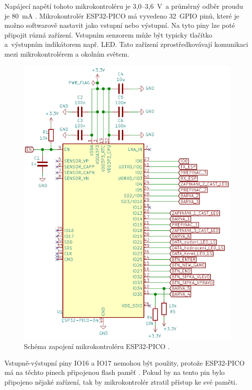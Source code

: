   Napájecí napětí tohoto mikrokontroléru je 3,0--3,6~V~a průměrný odběr proudu je 80~mA \cite{PICO_datasheet}. Mikrokontrolér ESP32-PICO má 
  vyvedeno 32~GPIO pinů, které je 
  možno softwarově nastavit jako vstupní nebo výstupní. Na tyto piny lze poté připojit různá zařízení. Vstupním senzorem může 
  být typicky tlačítko a~výstupním indikátorem např. LED. Tato zařízení zprostředkovávají komunikaci mezi mikrokontrolérem a okolním 
  světem.

  \begin{figure}[!h]
    \begin{center}
      \includegraphics[scale=0.5]{obrazky/ESP32_PICO_schema.png}
    \end{center}
    \caption[Schéma zapojení mikrokontroléru ESP32-PICO \cite{PICO_datasheet}]{Schéma zapojení mikrokontroléru ESP32-PICO \cite{PICO_datasheet}.}
  \end{figure}

  Vstupně-výstupní piny IO16 a IO17 nemohou být použity, protože ESP32-PICO má na těchto pinech připojenou flash paměť \cite{PICO_datasheet}.
  Pokud by na tento pin bylo připojeno nějaké zařízení, tak by mikrokontrolér ztratil přístup ke své paměti.

